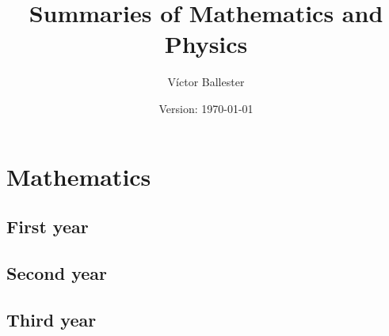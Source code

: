 \documentclass{report}
\title{Summaries of Mathematics and Physics}
\author{Víctor Ballester}
\date{Version: \today}
\begin{document}
\maketitle
\newpage
\tableofcontents
\newpage
\part{Mathematics}
\chapter{First year}
\newpage

\cleardoublepage


\cleardoublepage


\cleardoublepage


\chapter{Second year}
\newpage

\cleardoublepage


\cleardoublepage


\cleardoublepage


\cleardoublepage


\cleardoublepage


\cleardoublepage


\chapter{Third year}
\newpage

\cleardoublepage


\cleardoublepage


\cleardoublepage


\cleardoublepage
\end{document}
